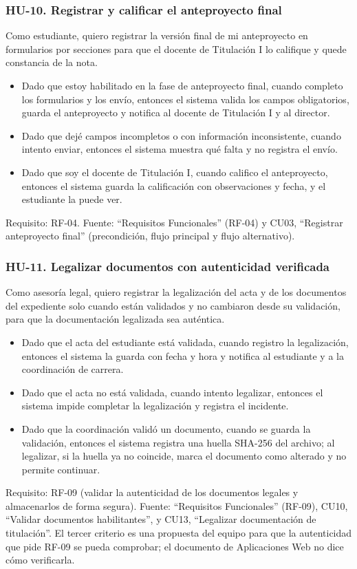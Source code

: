 \subsubsection*{HU-10. Registrar y calificar el anteproyecto final}
Como estudiante, quiero registrar la versión final de mi anteproyecto en formularios por secciones para que el docente de Titulación I lo califique y quede constancia de la nota.
\begin{itemize}
  \item Dado que estoy habilitado en la fase de anteproyecto final, cuando completo los formularios y los envío, entonces el sistema valida los campos obligatorios, guarda el anteproyecto y notifica al docente de Titulación I y al director.
  \item Dado que dejé campos incompletos o con información inconsistente, cuando intento enviar, entonces el sistema muestra qué falta y no registra el envío.
  \item Dado que soy el docente de Titulación I, cuando califico el anteproyecto, entonces el sistema guarda la calificación con observaciones y fecha, y el estudiante la puede ver.
\end{itemize}
Requisito: RF-04. Fuente: \enquote{Requisitos Funcionales} (RF-04) y CU03, \enquote{Registrar anteproyecto final} (precondición, flujo principal y flujo alternativo).

\subsubsection*{HU-11. Legalizar documentos con autenticidad verificada}
Como asesoría legal, quiero registrar la legalización del acta y de los documentos del expediente solo cuando están validados y no cambiaron desde su validación, para que la documentación legalizada sea auténtica.
\begin{itemize}
  \item Dado que el acta del estudiante está validada, cuando registro la legalización, entonces el sistema la guarda con fecha y hora y notifica al estudiante y a la coordinación de carrera.
  \item Dado que el acta no está validada, cuando intento legalizar, entonces el sistema impide completar la legalización y registra el incidente.
  \item Dado que la coordinación validó un documento, cuando se guarda la validación, entonces el sistema registra una huella SHA-256 del archivo; al legalizar, si la huella ya no coincide, marca el documento como alterado y no permite continuar.
\end{itemize}
Requisito: RF-09 (validar la autenticidad de los documentos legales y almacenarlos de forma segura). Fuente: \enquote{Requisitos Funcionales} (RF-09), CU10, \enquote{Validar documentos habilitantes}, y CU13, \enquote{Legalizar documentación de titulación}. El tercer criterio es una propuesta del equipo para que la autenticidad que pide RF-09 se pueda comprobar; el documento de Aplicaciones Web no dice cómo verificarla.

